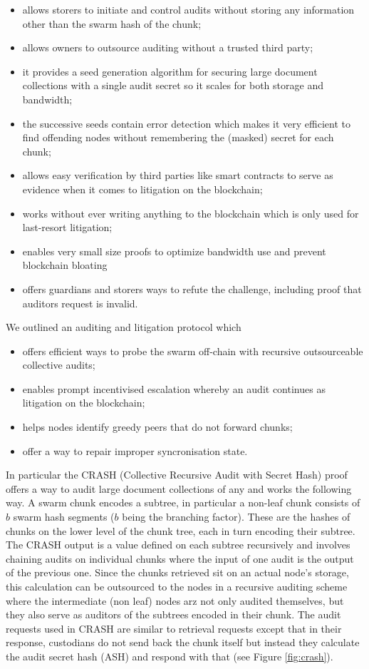 \documentclass[12pt]{article}
\begin{document}
\begin{itemize}
\item  allows storers to initiate and control audits without storing any information other than the swarm hash of the chunk;
\item  allows owners to outsource auditing without a trusted third party;
\item  it provides a seed generation algorithm for securing large document collections with a single audit secret so it scales for both storage and bandwidth;
\item  the successive seeds contain error detection which makes it very efficient to find offending nodes without remembering the (masked) secret for each chunk;
\item  allows easy verification by third parties like smart contracts to serve as evidence  when it comes to litigation on the blockchain;
\item  works without ever writing anything to the blockchain which is only used for last-resort litigation;
\item  enables very small size proofs to optimize bandwidth use and prevent blockchain bloating
\item  offers guardians and storers ways to refute the challenge, including proof that auditors request is invalid.
\end{itemize}

We outlined an auditing and litigation protocol which

\begin{itemize}
\item  offers efficient ways to probe the swarm off-chain with recursive outsourceable collective audits;
\item  enables prompt incentivised escalation whereby an audit continues as litigation on the blockchain;
\item  helps nodes identify greedy peers that do not forward chunks;
\item  offer a way to repair improper syncronisation state.
\end{itemize}

In particular the CRASH (Collective Recursive Audit with Secret Hash) proof offers a way to audit large document collections of any and works the following way.
A swarm chunk encodes a subtree, in particular a non-leaf chunk consists of $b$ swarm hash segments ($b$ being the branching factor). These are the hashes of chunks on the lower level of the chunk tree, each in turn encoding their subtree. The CRASH output is a value defined on each subtree recursively and involves chaining audits on individual chunks where the input of one audit is the output of the previous one.
Since the chunks retrieved sit on an actual node's storage, this calculation can be outsourced to the nodes in a recursive auditing scheme where the intermediate (non leaf) nodes arz not only audited themselves, but they also serve as auditors of the subtrees encoded in their chunk. The audit requests used in CRASH are similar to retrieval requests except that in their response, custodians do not send back the chunk itself but instead they calculate the audit secret hash (ASH) and respond with that (see Figure \ref{fig:crash}).
\end{document}
